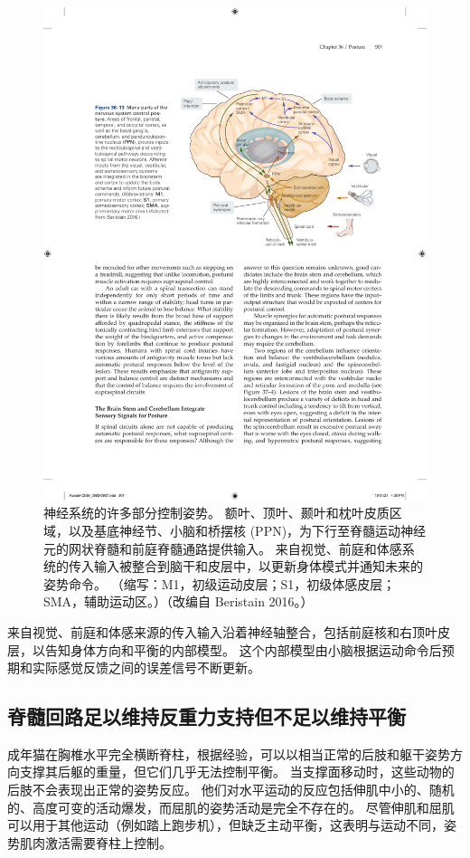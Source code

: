 \begin{figure}[htbp]
	\centering
	\includegraphics[width=0.75\linewidth]{chap36/fig_36_13}
	\caption{神经系统的许多部分控制姿势。 额叶、顶叶、颞叶和枕叶皮质区域，以及基底神经节、小脑和桥摆核 (PPN)，为下行至脊髓运动神经元的网状脊髓和前庭脊髓通路提供输入。 来自视觉、前庭和体感系统的传入输入被整合到脑干和皮层中，以更新身体模式并通知未来的姿势命令。 （缩写：M1，初级运动皮层；S1，初级体感皮层；SMA，辅助运动区。）（改编自 Beristain 2016。）}
	\label{fig:36_13}
\end{figure}


来自视觉、前庭和体感来源的传入输入沿着神经轴整合，包括前庭核和右顶叶皮层，以告知身体方向和平衡的内部模型。
这个内部模型由小脑根据运动命令后预期和实际感觉反馈之间的误差信号不断更新。



\subsection{脊髓回路足以维持反重力支持但不足以维持平衡}

成年猫在胸椎水平完全横断脊柱，根据经验，可以以相当正常的后肢和躯干姿势方向支撑其后躯的重量，但它们几乎无法控制平衡。
当支撑面移动时，这些动物的后肢不会表现出正常的姿势反应。
他们对水平运动的反应包括伸肌中小的、随机的、高度可变的活动爆发，而屈肌的姿势活动是完全不存在的。
尽管伸肌和屈肌可以用于其他运动（例如踏上跑步机），但缺乏主动平衡，这表明与运动不同，姿势肌肉激活需要脊柱上控制。


